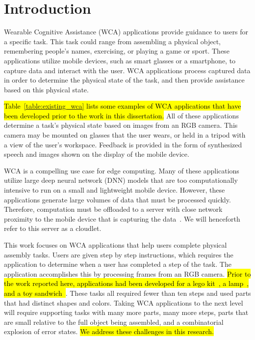 \chapter{Introduction}\label{chap:intro}

Wearable Cognitive Assistance (WCA) applications provide guidance to users for
a specific task.
This task could range from assembling a physical object, remembering people's
names, exercising, or playing a game or sport.
These applications
utilize mobile devices, such as smart glasses or a smartphone, to capture data
and interact with the user.
WCA applications process captured data in order to determine the physical state
of the task, and then provide assistance based on this physical state.

\hl{
  Table~{\ref{table:existing_wca}} lists some examples of WCA applications that
  have been developed prior to the work in this dissertation.}
All of these applications determine a task's physical state based on images from
an RGB camera.
This camera may be mounted on glasses that the user wears, or held in a tripod
with a view of the user's workspace.
Feedback is provided in the form of synthesized speech and images shown on the
display of the mobile device.

WCA is a compelling use case for edge computing. Many of these applications
utilize large deep neural network (DNN) models that are too computationally
intensive to run on a small and lightweight mobile device. However, these
applications generate large volumes of data that must be processed quickly.
Therefore, computation must be offloaded to a server with close network
proximity to the mobile device that is capturing the data~\cite{satya14}. We
will henceforth refer to this server as a cloudlet.

This work focuses on WCA applications that help users complete physical
assembly tasks.
Users are given step by step instructions, which requires the application to
determine when a user has completed a step of the task.
The application accomplishes this by processing frames from an RGB camera.
\hl{Prior to the work reported here, applications had been
developed for a lego kit~{\cite{lego}}, a lamp~{\cite{lamp}}, and a toy
sandwich~{\cite{sandwich}}}.
These tasks all required fewer than ten steps and
used parts that had distinct shapes and colors.
Taking WCA applications to the next level will require supporting tasks with
many more parts, many more steps, parts that are small relative to the full
object being assembled, and a combinatorial explosion of error states.
\hl{We address these challenges in this research.}

